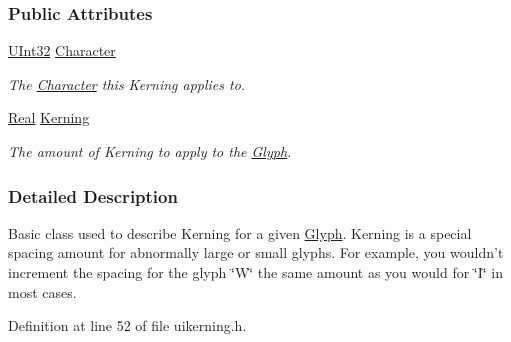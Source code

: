 \subsubsection*{Public Attributes}
\begin{DoxyCompactItemize}
\item 
\hypertarget{structMezzanine_1_1UI_1_1KerningInfo_a1174fdb6e0a71495192c6aef64dfcdac}{
\hyperlink{namespaceMezzanine_abea3b8e8e9b03d2547b2800284ba682d}{UInt32} \hyperlink{structMezzanine_1_1UI_1_1KerningInfo_a1174fdb6e0a71495192c6aef64dfcdac}{Character}}
\label{structMezzanine_1_1UI_1_1KerningInfo_a1174fdb6e0a71495192c6aef64dfcdac}

\begin{DoxyCompactList}\small\item\em The \hyperlink{structMezzanine_1_1UI_1_1Character}{Character} this Kerning applies to. \item\end{DoxyCompactList}\item 
\hypertarget{structMezzanine_1_1UI_1_1KerningInfo_a0ba6f8933bac14c67251b9ad752056af}{
\hyperlink{namespaceMezzanine_a726731b1a7df72bf3583e4a97282c6f6}{Real} \hyperlink{structMezzanine_1_1UI_1_1KerningInfo_a0ba6f8933bac14c67251b9ad752056af}{Kerning}}
\label{structMezzanine_1_1UI_1_1KerningInfo_a0ba6f8933bac14c67251b9ad752056af}

\begin{DoxyCompactList}\small\item\em The amount of Kerning to apply to the \hyperlink{classMezzanine_1_1UI_1_1Glyph}{Glyph}. \item\end{DoxyCompactList}\end{DoxyCompactItemize}


\subsubsection{Detailed Description}
Basic class used to describe Kerning for a given \hyperlink{classMezzanine_1_1UI_1_1Glyph}{Glyph}. Kerning is a special spacing amount for abnormally large or small glyphs. For example, you wouldn't increment the spacing for the glyph \char`\"{}W\char`\"{} the same amount as you would for \char`\"{}I\char`\"{} in most cases. 

Definition at line 52 of file uikerning.h.



